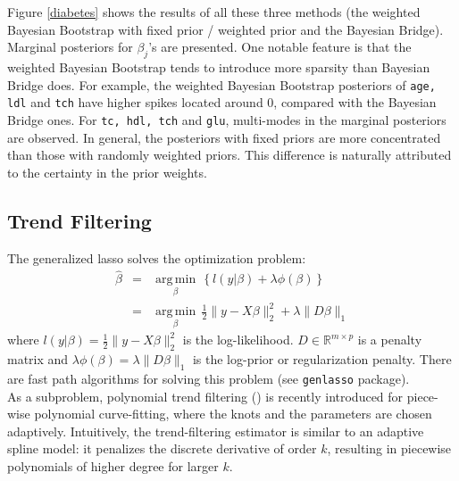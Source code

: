 \documentclass[11pt]{article}%
\DeclareMathOperator*{\argmin}{arg\,min} %
\begin{document}
\noindent Figure \ref{diabetes} shows the results of all these three methods (the weighted Bayesian Bootstrap with fixed prior / weighted prior and the Bayesian Bridge). Marginal posteriors for $\beta_j$'s are presented. One notable feature is that the weighted Bayesian Bootstrap tends to introduce more sparsity than Bayesian Bridge does. For example, the weighted Bayesian Bootstrap posteriors of {\tt age, ldl} and {\tt tch} have higher spikes located around 0, compared with the Bayesian Bridge ones. For {\tt tc, hdl, tch} and {\tt glu}, multi-modes in the marginal posteriors are observed. In general, the posteriors with fixed priors are more concentrated than those with randomly weighted priors. This difference is naturally attributed to the certainty in the prior weights.


\subsection{Trend Filtering}
The generalized lasso solves the optimization problem:
\begin{eqnarray}
\hat \beta &=& \underset{\beta}{\argmin} \, \left\{ l(y|\beta) + \lambda\phi(\beta)  \right\}\\
&=& \underset{\beta}{\argmin} \, \frac{1}{2}\|y - X\beta\|_2^2 + \lambda \|D\beta\|_1
\end{eqnarray}
where $ l(y|\beta) = \frac{1}{2}\|y - X\beta\|_2^2 $ is the log-likelihood. $D \in \mathbb{R}^{m\times p}$ is a penalty matrix and $ \lambda\phi(\beta) = \lambda \|D\beta\|_1$ is the log-prior or regularization penalty. There are fast path algorithms for solving this problem (see {\tt genlasso} package).\\

\noindent   As a subproblem, polynomial trend filtering (\cite{tibshirani2014adaptive, polson2015mixtures}) is recently introduced for piece-wise polynomial curve-fitting, where the knots and the parameters are chosen adaptively. Intuitively, the trend-filtering estimator is similar to an adaptive spline model: it penalizes the discrete derivative of order $k$, resulting in piecewise polynomials of higher degree for larger $k$.\\
\end{document}
